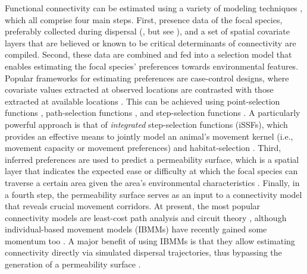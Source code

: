 \documentclass[../FinalThesis.tex]{subfiles}
\begin{document}
Functional connectivity can be estimated using a variety of modeling techniques
\citep{Diniz.2019}, which all comprise four main steps. First, presence data of
the focal species, preferably collected during dispersal (\citealp{Elliot.2014,
Vasudev.2015, Benz.2016}, but see \citealp{Fattebert.2015}), and a set of
spatial covariate layers that are believed or known to be critical determinants
of connectivity are compiled. Second, these data are combined and fed into a
selection model that enables estimating the focal species' preferences towards
environmental features. Popular frameworks for estimating preferences are
case-control designs, where covariate values extracted at observed locations are
contrasted with those extracted at available locations \citep{Beyer.2010,
Fieberg.2010}. This can be achieved using point-selection functions
\citep{Boyce.2002, Manly.2007}, path-selection functions \citep{Cushman.2010},
and step-selection functions \citep{Fortin.2005, Thurfjell.2014}. A particularly
powerful approach is that of \textit{integrated} step-selection functions
(iSSFs), which provides an effective means to jointly model an animal's movement
kernel (i.e., movement capacity or movement preferences) and habitat-selection
\citep{Avgar.2016, Fieberg.2021}. Third, inferred preferences are used to
predict a permeability surface, which is a spatial layer that indicates the
expected ease or difficulty at which the focal species can traverse a certain
area given the area's environmental characteristics \citep{Zeller.2012}.
Finally, in a fourth step, the permeability surface serves as an input to a
connectivity model that reveals crucial movement corridors. At present, the most
popular connectivity models are least-cost path analysis \citep{Adriaensen.2003}
and circuit theory \citep{McRae.2008}, although individual-based movement models
(IBMMs) have recently gained some momentum too \citep{Kanagaraj.2013,
Allen.2016, Hauenstein.2019, Zeller.2020, UnnithanKumar.2022a,
UnnithanKumar.2022, Hofmann.2023}. A major benefit of using IBMMs is that they
allow estimating connectivity directly via simulated dispersal trajectories,
thus bypassing the generation of a permeability surface
\citep{UnnithanKumar.2022a, Hofmann.2023}.

\end{document}
